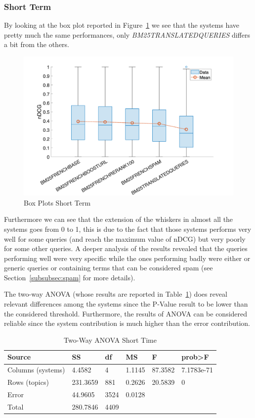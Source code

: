 \subsubsection{Short Term}
\label{subsubsec:st}
By looking at the box plot reported in Figure~\ref{fig:STBP} we see that the systems have pretty much the same performances, only \textit{BM25TRANSLATEDQUERIES} differs a bit from the others.
\begin{figure}[tb]
    \centering
    \includegraphics[scale=0.5]{figure/shortterm/boxplot.png}
    \caption{Box Plots Short Term}
    \label{fig:STBP}
\end{figure}
Furthermore we can see that the extension of the whiskers in almost all the systems goes from 0 to 1, this is due to the fact that those systems performs very well for some queries (and reach the maximum value of nDCG) but very poorly for some other queries. A deeper analysis of the results revealed that the queries performing well were very specific while the ones performing badly were either or generic queries or containing terms that can be considered spam (see Section~\ref{subsubsec:spam} for more details).
\par
The two-way \ac{ANOVA} (whose results are reported in Table~\ref{tab:STANOVA}) does reveal relevant differences among the systems since the P-Value result to be lower than the considered threshold. Furthermore, the results of \ac{ANOVA} can be considered reliable since the system contribution is much higher than the error contribution.
\begin{table}[tb]
  \caption{Two-Way ANOVA Short Time}
  \label{tab:STANOVA}
  \centering
  \begin{tabular}{|l|l|l|l|l|l|}
    \toprule
    Source & SS & df & MS & F & prob>F\\
    \midrule
    Columns (systems) & 4.4582 & 4 & 1.1145 & 87.3582 & 7.1783e-71\\
    Rows (topics) & 231.3659 & 881 & 0.2626 & 20.5839 & 0\\
    Error & 44.9605 & 3524 & 0.0128 &  & \\
    Total & 280.7846 & 4409 &  &  & \\
  \bottomrule
\end{tabular}
\end{table}
